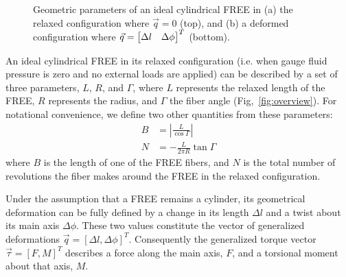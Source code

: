 \begin{figure}
    \centering
    \caption{Geometric parameters of an ideal cylindrical FREE in (a) the relaxed configuration where ${\vec{q}=0}$ (top), and (b) a deformed configuration where ${\vec{q} = \begin{bmatrix} \Delta l & \Delta \phi \end{bmatrix}^T}$ (bottom).}
    \label{fig:FREEparams}
\end{figure}

An ideal cylindrical FREE in its relaxed configuration (i.e. when gauge fluid pressure is zero and no external loads are applied) can be described by a set of three parameters, $L$, $R$, and $\Gamma$, where $L$ represents the relaxed length of the FREE, $R$ represents the radius, and $\Gamma$ the fiber angle (Fig,~\ref{fig:overview}). 
For notational convenience, we define two other quantities from these parameters:
\begin{align}
	B &= \left| \frac{L}{\cos{\Gamma}} \right| \\
	N &= - \frac{L}{2 \pi R} \tan{\Gamma}
\end{align}
where $B$ is the length of one of the FREE fibers, and $N$ is the total number of revolutions the fiber makes around the FREE in the relaxed configuration. 

Under the assumption that a FREE remains a cylinder, its geometrical deformation can be fully defined by a change in its length $\Delta l$ and a twist about its main axis $\Delta \phi$.
These two values constitute the vector of generalized deformations $\vec{q} = \left[ \Delta l, \Delta \phi \right]^T$.
Consequently the generalized torque vector $\vec{\tau} = \left[ F, M \right]^T$ describes a force along the main axis, $F$, and a torsional moment about that axis, $M$.

